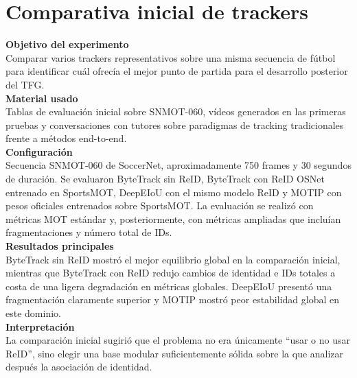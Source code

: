 \documentclass[../MAIN.tex]{subfiles}
\begin{document}
	
	
	\section{Comparativa inicial de trackers}
	
	
	\begin{chaptertemplatebox}
		\textbf{Objetivo del experimento}\\
		Comparar varios trackers representativos sobre una misma secuencia de fútbol para identificar cuál ofrecía el mejor punto de partida para el desarrollo posterior del TFG.\\[0.5em]
		
		\textbf{Material usado}\\
		Tablas de evaluación inicial sobre SNMOT-060, vídeos generados en las primeras pruebas y conversaciones con tutores sobre paradigmas de tracking tradicionales frente a métodos end-to-end.\\[0.5em]
		
		\textbf{Configuración}\\
		Secuencia SNMOT-060 de SoccerNet, aproximadamente 750 frames y 30 segundos de duración. Se evaluaron ByteTrack sin ReID, ByteTrack con ReID OSNet entrenado en SportsMOT, DeepEIoU con el mismo modelo ReID y MOTIP con pesos oficiales entrenados sobre SportsMOT. La evaluación se realizó con métricas MOT estándar y, posteriormente, con métricas ampliadas que incluían fragmentaciones y número total de IDs.\\[0.5em]
		
		\textbf{Resultados principales}\\
		ByteTrack sin ReID mostró el mejor equilibrio global en la comparación inicial, mientras que ByteTrack con ReID redujo cambios de identidad e IDs totales a costa de una ligera degradación en métricas globales. DeepEIoU presentó una fragmentación claramente superior y MOTIP mostró peor estabilidad global en este dominio.\\[0.5em]
		
		\textbf{Interpretación}\\
		La comparación inicial sugirió que el problema no era únicamente “usar o no usar ReID”, sino elegir una base modular suficientemente sólida sobre la que analizar después la asociación de identidad.\\[0.5em]
		

\end{chaptertemplatebox}
\end{document}
